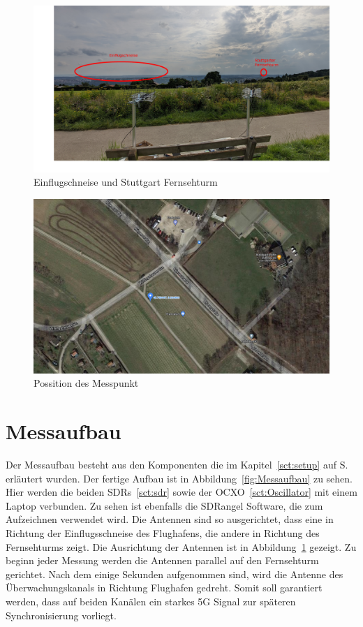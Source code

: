 \begin{figure}
    \centering
    \includegraphics[width=\textwidth]{images/Einflugschneise.jpg}
    \caption{Einflugschneise und Stuttgart Fernsehturm}\label{fig:Einflugschneise}
\end{figure}

\begin{figure}
    \centering
    \includegraphics[width=\textwidth]{images/Maps_Messpunkt.png}
    \caption{Possition des Messpunkt}\label{fig:Maps}
\end{figure}

\section{Messaufbau}
Der Messaufbau besteht aus den Komponenten die im Kapitel~\ref{sct:setup} auf S.\pageref{sct:setup} erläutert wurden. Der fertige Aufbau ist in Abbildung~\ref{fig:Messaufbau} zu sehen. Hier werden die beiden SDRs~\ref{sct:sdr} sowie der OCXO~\ref{sct:Oscillator} mit einem Laptop verbunden. Zu sehen ist ebenfalls die SDRangel Software, die zum Aufzeichnen verwendet wird. Die Antennen sind so ausgerichtet, dass eine in Richtung der Einflugsschneise des Flughafens, die andere in Richtung des Fernsehturms zeigt. Die Ausrichtung der Antennen ist in Abbildung~\ref{fig:Einflugschneise} gezeigt. Zu beginn jeder Messung werden die Antennen parallel auf den Fernsehturm gerichtet. Nach dem einige Sekunden aufgenommen sind, wird die Antenne des Überwachungskanals in Richtung Flughafen gedreht. Somit soll garantiert werden, dass auf beiden Kanälen ein starkes 5G Signal zur späteren Synchronisierung vorliegt.

